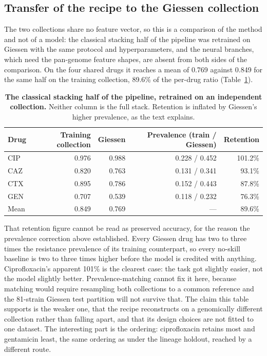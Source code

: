 \subsection*{Transfer of the recipe to the Giessen collection}

The two collections share no feature vector, so this is a comparison of the method and not of a
model: the classical stacking half of the pipeline was retrained on Giessen with the same protocol
and hyperparameters, and the neural branches, which need the pan-genome feature shapes, are absent
from both sides of the comparison. On the four shared drugs it reaches a mean of 0.769 against
0.849 for the same half on the training collection, 89.6\% of the per-drug ratio
(Table~\ref{tab:giessen}).

\begin{table}[t]\centering\small
\caption{\textbf{The classical stacking half of the pipeline, retrained on an independent
collection.} Neither column is the full stack. Retention is inflated by Giessen's higher
prevalence, as the text explains.}
\label{tab:giessen}
\begin{tabular}{lrrrr}
\toprule
Drug & Training collection & Giessen & Prevalence (train / Giessen) & Retention \\
\midrule
CIP & 0.976 & 0.988 & 0.228 / 0.452 & 101.2\% \\
CAZ & 0.820 & 0.763 & 0.131 / 0.341 & 93.1\% \\
CTX & 0.895 & 0.786 & 0.152 / 0.443 & 87.8\% \\
GEN & 0.707 & 0.539 & 0.118 / 0.232 & 76.3\% \\
\midrule
Mean & 0.849 & 0.769 & --- & 89.6\% \\
\bottomrule
\end{tabular}
\end{table}

That retention figure cannot be read as preserved accuracy, for the reason the prevalence correction
above established. Every Giessen drug has two to three times the resistance prevalence of its
training counterpart, so every no-skill baseline is two to three times higher before the model is
credited with anything. Ciprofloxacin's apparent 101\% is the clearest case: the task got slightly
easier, not the model slightly better. Prevalence-matching cannot fix it here, because matching
would require resampling both collections to a common reference and the 81-strain Giessen test
partition will not survive that. The claim this table supports is the weaker one, that the recipe
reconstructs on a genomically different collection rather than falling apart, and that its design
choices are not fitted to one dataset. The interesting part is the ordering: ciprofloxacin retains
most and gentamicin least, the same ordering as under the lineage holdout, reached by a different
route.
